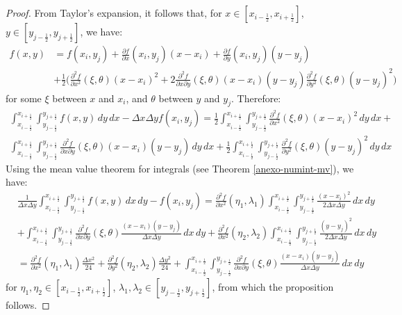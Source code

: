 \begin{proof}
	From Taylor's expansion, it follows that, for $x \in [x_{i-\frac{1}{2}},x_{i+\frac{1}{2}}]$, 
	$y \in [y_{j-\frac{1}{2}},y_{j+\frac{1}{2}}]$, we have:
	\begin{align*}
		f(x,y) &= f(x_i,y_j) +  \frac{\partial f}{\partial x}(x_i,y_j)(x-x_i) +\frac{\partial f}{\partial y}(x_i,y_j)(y-y_j) \\
		&+\frac{1}{2}\bigg(\frac{\partial^2 f}{\partial x^2}(\xi,\theta)(x-x_i)^2 +
		2\frac{\partial^2 f}{\partial x \partial y}(\xi,\theta)(x-x_i)(y-y_j)
		\frac{\partial^2 f}{\partial y^2}(\xi,\theta)(y-y_j)^2 \bigg)
	\end{align*}
	for some $\xi$ between $x$ and $x_i$, and $\theta$ between $y$ and $y_j$. Therefore:
	\begin{align*}
		\int_{x_{i-\frac{1}{2}}}^{x_{i+\frac{1}{2}}} 
		\int_{y_{j-\frac{1}{2}}}^{y_{j+\frac{1}{2}}} {f(x,y)\,dy \,dx} - \Delta x \Delta y f(x_i,y_j)  
		= 
		\frac{1}{2} 	
		\int_{x_{i-\frac{1}{2}}}^{x_{i+\frac{1}{2}}} 
		\int_{y_{j-\frac{1}{2}}}^{y_{j+\frac{1}{2}}} 
		{\frac{\partial^2 f}{\partial x^2}(\xi,\theta)(x-x_i)^2 \,dy \,dx} + \\
		\int_{x_{i-\frac{1}{2}}}^{x_{i+\frac{1}{2}}} 
		\int_{y_{j-\frac{1}{2}}}^{y_{j+\frac{1}{2}}} 
		{\frac{\partial^2 f}{\partial x \partial y}(\xi,\theta)(x-x_i)(y-y_j) \,dy \,dx}+
		\frac{1}{2} 	
		\int_{x_{i-\frac{1}{2}}}^{x_{i+\frac{1}{2}}} 
		\int_{y_{j-\frac{1}{2}}}^{y_{j+\frac{1}{2}}} 
		{\frac{\partial^2 f}{\partial y^2}(\xi,\theta)(y-y_j)^2 \,dy \,dx}
	\end{align*}
	Using the mean value theorem for integrals (see Theorem \ref{anexo-numint-mv}), we have:
	\begin{align*}
		&\frac{1}{\Delta x \Delta y}
		\int_{x_{i-\frac{1}{2}}}^{x_{i+\frac{1}{2}}} 
		\int_{y_{j-\frac{1}{2}}}^{y_{j+\frac{1}{2}}} 
		{f(x,y)\,dx \,dy} - f(x_i, y_j)  = 
		{\frac{\partial^2f}{\partial x^2}}(\eta_1, \lambda_1)
		\int_{x_{i-\frac{1}{2}}}^{x_{i+\frac{1}{2}}} 
		\int_{y_{j-\frac{1}{2}}}^{y_{j+\frac{1}{2}}}
		\frac{(x-x_i)^2}{2 \Delta x \Delta y}  \,dx \,dy \\  
		&+
		\int_{x_{i-\frac{1}{2}}}^{x_{i+\frac{1}{2}}} 
		\int_{y_{j-\frac{1}{2}}}^{y_{j+\frac{1}{2}}}
		{\frac{\partial^2 f}{\partial x \partial y}}(\xi,\theta)
		 \frac{(x-x_i)(y-y_j)}{\Delta x \Delta y}  \,dx \,dy +
		{\frac{\partial^2 f}{\partial x^2}}(\eta_2, \lambda_2)
		\int_{x_{i-\frac{1}{2}}}^{x_{i+\frac{1}{2}}} 
		\int_{y_{j-\frac{1}{2}}}^{y_{j+\frac{1}{2}}}
		\frac{(y-y_j)^2}{2 \Delta x \Delta y}  \,dx \,dy \\
		&= {\frac{\partial^2f}{\partial x^2}}(\eta_1, \lambda_1) \frac{\Delta x ^2}{24} +
	      {\frac{\partial^2f}{\partial y^2}}(\eta_2, \lambda_2) \frac{\Delta y ^2}{24} +
	   		\int_{x_{i-\frac{1}{2}}}^{x_{i+\frac{1}{2}}} 
	   \int_{y_{j-\frac{1}{2}}}^{y_{j+\frac{1}{2}}}
	   {\frac{\partial^2 f}{\partial x \partial y}}(\xi,\theta)
	   \frac{(x-x_i)(y-y_j)}{\Delta x \Delta y}  \,dx \,dy
	\end{align*}	
	for $\eta_1, \eta_2 \in [x_{i-\frac{1}{2}},x_{i+\frac{1}{2}}]$, 
	$\lambda_1, \lambda_2  \in [y_{j-\frac{1}{2}},y_{j+\frac{1}{2}}]$,
	from which the proposition follows.
\end{proof}

